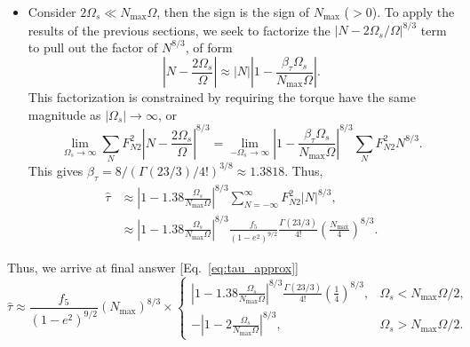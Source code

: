 \documentclass[
        fleqn,
        usenatbib,
        referee,
    ]{mnras}
\newcommand*{\abs}[1]{\left|#1\right|}
\newcommand*{\p}[1]{\left(#1\right)}
\begin{document}
\begin{itemize}
    \item Consider $2\Omega_s \ll N_{\max} \Omega$, then the sign is the
        sign of $N_{\max}$ ($>0$). To apply the results of the previous
        sections, we seek to factorize the $\abs{N - 2\Omega_s/\Omega}^{8/3}$
        term to pull out the factor of $N^{8/3}$, of form
        \begin{equation}
            \abs{N - \frac{2\Omega_s}{\Omega}} \approx \abs{N}\abs{1 -
                \frac{\beta_\tau \Omega_s}{N_{\max}\Omega}}.
        \end{equation}
        This factorization is constrained by requiring the torque have the same
        magnitude as $\abs{\Omega_s} \to \infty$, or
        \begin{equation}
            \lim_{\Omega_s \to \infty}
                    \sum\limits_{N} F_{N2}^2
                        \abs{N - \frac{2\Omega_s}{\Omega}}^{8/3}
                = \lim_{-\Omega_s \to \infty}
                    \abs{1 - \frac{\beta_\tau \Omega_s}{N_{\max}\Omega}}^{8/3}
                        \sum\limits_{N}F_{N2}^2 N^{8/3}.
        \end{equation}
        This gives $\beta_\tau = 8 / \p{\Gamma\p{23/3} / 4!}^{3/8} \approx
        1.3818$. Thus,
        \begin{align}
            \hat{\tau}
                &\approx \abs{1 - 1.38\frac{\Omega_s}{N_{\max}\Omega}}^{8/3}
                    \sum\limits_{N = -\infty}^\infty F_{N2}^2 \abs{N}^{8/3},\\
                &\approx \abs{1 - 1.38\frac{\Omega_s}{N_{\max}\Omega}}^{8/3}
                    \frac{f_5}{\p{1 - e^2}^{9/2}}
                    \frac{\Gamma(23/3)}{4!}
                    \p{\frac{N_{\max}}{4}}^{8/3}.
        \end{align}
\end{itemize}
Thus, we arrive at final answer [Eq.~\eqref{eq:tau_approx}]
\begin{equation}
    \hat{\tau} \approx
        \frac{f_5}{\p{1 - e^2}^{9/2}}\p{N_{\max}}^{8/3} \times
    \begin{cases}
        \abs{1 - 1.38\frac{\Omega_s}{N_{\max}\Omega}}^{8/3}
            \frac{\Gamma(23/3)}{4!}\p{\frac{1}{4}}^{8/3},
            & \Omega_s < N_{\max}\Omega / 2,\\[5pt]
        -\abs{1 - 2\frac{\Omega_s}{N_{\max}\Omega}}^{8/3},
            & \Omega_s > N_{\max}\Omega / 2.
    \end{cases}
\end{equation}
\end{document}
